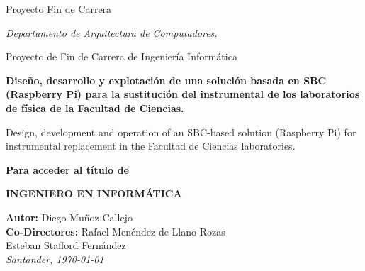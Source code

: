 \begin{titlepage}
\begin{center}
Proyecto Fin de Carrera 

\emph{\large{Departamento de Arquitectura de Computadores.}}

Proyecto de Fin de Carrera de Ingeniería Informática

\vspace*{0.4cm}


\textbf{Diseño, desarrollo y explotación de una solución basada en SBC (Raspberry Pi) para la sustitución del instrumental de los laboratorios de física de la Facultad de Ciencias.}

\large{Design, development and operation of an SBC-based solution (Raspberry Pi) for instrumental replacement in the Facultad de Ciencias laboratories.}
\vspace*{0.4cm}
\centerline{\bfseries{Para acceder al título de}}
\centerline{\bfseries{INGENIERO EN INFORMÁTICA}}

\end{center}

\begin{flushright}
{{\bf Autor:} Diego Muñoz Callejo}\\
{{\bf Co-Directores:} Rafael Menéndez de Llano Rozas}\\ Esteban Stafford Fernández\\[0.2cm]
{\slshape Santander, \today}
\end{flushright}

\end{titlepage} 
\pagebreak \mbox{}\pagebreak